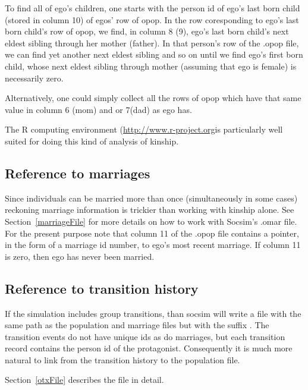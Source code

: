To find all of ego's children, one starts with the person id of ego's
last born child (stored in column 10) of egos' row of opop.  In the
row coresponding to ego's last born child's row of opop, we find, in
column 8 (9), ego's last born child's next eldest sibling through her
mother (father).  In that person's row of the .opop file, we can find
yet another next eldest sibling and so on until we find ego's first
born child, whose next eldest sibling through mother (assuming that
ego is female) is necessarily zero.

Alternatively, one could simply collect all the rows of opop which
have that same value in column 6 (mom) and or 7(dad) as ego has.

The R computing environment (\url{http://www.r-project.org}is
particularly well suited for doing this kind of analysis of kinship.

\subsection{Reference to  marriages}

Since individuals can be married more than once (simultaneously in
some cases) reckoning marriage information is trickier than working
with kinship alone.  See Section~\ref{marriageFile} for more details
on how to work with Socsim's .omar file.  For the present purpose note
that column 11 of the .opop file contains a pointer, in the form of a
marriage id number, to ego's most recent marriage.  If column 11 is
zero, then ego has never been married.

\subsection{Reference to transition history}
If the simulation includes group transitions, than socsim will write a
file with the same path as the population and marriage files but with
the suffix .  The transition events do not have unique ids
as do marriages, but each transition record contains the person id of
the protagonist. Consequently it is much more natural to link from the
transition history to the population file.

Section~\ref{otxFile} describes the   file in detail.


